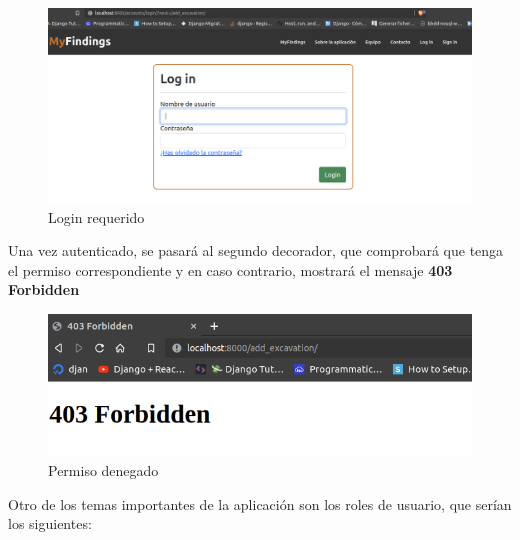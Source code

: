     \begin{figure}[H]
        \centering
        \includegraphics[scale=0.26]{imagenes/login-required.png}
        \caption{Login requerido}
        \label{fig:login-required}
    \end{figure}


\newpage Una vez autenticado, se pasará al segundo decorador, que comprobará que tenga el permiso
correspondiente y en caso contrario, mostrará el mensaje \textbf{403 Forbidden}

    \begin{figure}[H]
        \centering
        \includegraphics[scale=0.50]{imagenes/403-forbidden.png}
        \caption{Permiso denegado}
        \label{fig:403-forbidden}
    \end{figure}

Otro de los temas importantes de la aplicación son los roles de usuario, que serían los
siguientes:

